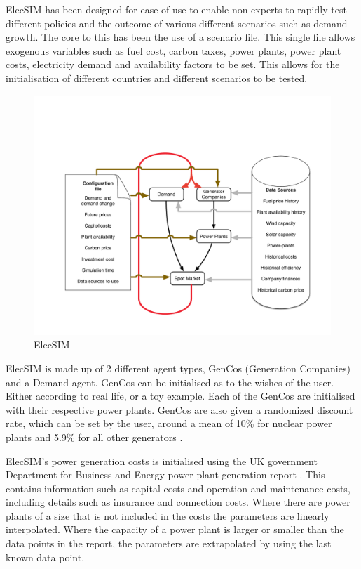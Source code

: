 
ElecSIM has been designed for ease of use to enable non-experts to rapidly test different policies and the outcome of various different scenarios such as demand growth. The core to this has been the use of a scenario file. This single file allows exogenous variables such as fuel cost, carbon taxes, power plants, power plant costs, electricity demand and availability factors to be set. This allows for the initialisation of different countries and different scenarios to be tested.

\begin{figure}[h]
	\centering
	\includegraphics[width=\linewidth]{figures/System overview.pdf}
	\caption{ElecSIM}
\end{figure}


ElecSIM is made up of 2 different agent types, GenCos (Generation Companies) and a Demand agent. GenCos can be initialised as to the wishes of the user. Either according to real life, or a toy example. Each of the GenCos are initialised with their respective power plants. GenCos are also given a randomized discount rate, which can be set by the user, around a mean of 10\% for nuclear power plants \cite{Paper2012} and 5.9\% for all other generators \cite{KPMG2017}.

ElecSIM's power generation costs is initialised using the UK government Department for Business and Energy power plant generation report \cite{Department2016}. This contains information such as capital costs and operation and maintenance costs, including details such as insurance and connection costs. Where there are power plants of a size that is not included in the  costs the parameters are linearly interpolated. Where the capacity of a power plant is larger or smaller than the data points in the report, the parameters are extrapolated by using the last known data point.


